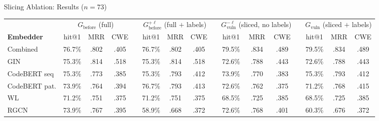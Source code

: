 \documentclass[aspectratio=169,10pt]{beamer}
\newcommand{\chit}[1]{\cellcolor{hit!30} #1}
\newcommand{\cmiss}[1]{\cellcolor{miss!25} #1}
\begin{document}
\begin{frame}{Slicing Ablation: Results ($n{=}73$)}

  \vspace{-0.4em}
  {\scriptsize
  \renewcommand{\arraystretch}{1.2}
  \setlength{\tabcolsep}{3pt}
  \begin{tabular}{l *{3}{c} c *{3}{c} c *{3}{c} c *{3}{c}}
    \toprule
    & \multicolumn{3}{c}{\textbf{$G_{\text{before}}$} {\scriptsize(full)}}
    && \multicolumn{3}{c}{\textbf{$G_{\text{before}}^{+\ell}$} {\scriptsize(full $+$ labels)}}
    && \multicolumn{3}{c}{\textbf{$G_{\text{vuln}}^{-\ell}$} {\scriptsize(sliced, no labels)}}
    && \multicolumn{3}{c}{\textbf{$G_{\text{vuln}}$} {\scriptsize(sliced $+$ labels)}} \\
    \cmidrule{2-4} \cmidrule{6-8} \cmidrule{10-12} \cmidrule{14-16}
    \textbf{Embedder}
      & hit@1 & MRR & CWE
      && hit@1 & MRR & CWE
      && hit@1 & MRR & CWE
      && hit@1 & MRR & CWE \\
    \midrule
    \rowcolor{c1!12}
    Combined
      & \chit{76.7\%} & .802 & .405
      && 76.7\% & .802 & .405
      && \chit{79.5\%} & \chit{.834} & \chit{.489}
      && \chit{79.5\%} & \chit{.834} & \chit{.489} \\
    GIN
      & 75.3\% & \chit{.814} & \chit{.518}
      && 75.3\% & .814 & .518
      && 72.6\% & .788 & .443
      && 72.6\% & .788 & .443 \\
    CodeBERT seq
      & 75.3\% & .773 & .385
      && 75.3\% & .793 & .412
      && 73.9\% & .770 & .383
      && 75.3\% & .793 & .412 \\
    CodeBERT pat.
      & 73.9\% & .764 & .394
      && 76.7\% & .793 & .413
      && 72.6\% & .762 & .375
      && 71.2\% & .768 & .415 \\
    WL
      & 71.2\% & .751 & .375
      && 71.2\% & .751 & .375
      && 68.5\% & .725 & .385
      && 68.5\% & .725 & .385 \\
    RGCN
      & 73.9\% & .767 & .395
      && \cmiss{58.9\%} & \cmiss{.668} & .372
      && 72.6\% & .768 & .401
      && \cmiss{60.3\%} & \cmiss{.676} & .372 \\
    \bottomrule
  \end{tabular}}


\end{frame}
\end{document}
